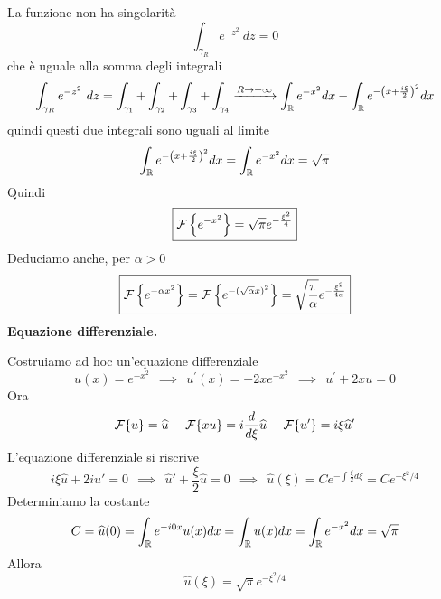 La funzione non ha singolarità
\begin{equation*}
\int _{\gamma _{R}} e^{ - z^{2}} \ dz = 0
\end{equation*}
che è uguale alla somma degli integrali
\begin{equation*}
\int _{\gamma _{R}} e^{ - z^{2}} \ dz = \int _{\gamma _{1}} + \int _{\gamma _{2}} + \int _{\gamma _{3}} + \int _{\gamma _{4}}\xrightarrow{R\rightarrow + \infty }\int _{\mathbb{R} } e^{ - x^{2}} dx - \int _{\mathbb{R} } e^{ - \left(x + \frac{i\xi }{2}\right)^{2}} dx
\end{equation*}
quindi questi due integrali sono uguali al limite
\begin{equation*}
\int _{\mathbb{R} } e^{ - \left(x + \frac{i\xi }{2}\right)^{2}} dx = \int _{\mathbb{R} } e^{ - x^{2}} dx = \sqrt{\pi }
\end{equation*}
Quindi
\begin{equation*}
\boxed{\mathcal{F} \left\{e^{ - x^{2}}\right\} = \sqrt{\pi } e^{ - \frac{\xi ^{2}}{4}}}
\end{equation*}
Deduciamo anche, per $\alpha  > 0$
\begin{equation*}
\boxed{\mathcal{F} \left\{e^{ - \alpha x^{2}}\right\} = \mathcal{F} \left\{e^{ - (\sqrt{\alpha } x)^{2}}\right\} = \sqrt{\frac{\pi }{\alpha }} e^{ - \frac{\xi ^{2}}{4\alpha }}}
\end{equation*}
\textbf{Equazione differenziale.}

Costruiamo ad hoc un'equazione differenziale
\begin{equation*}
u(x) = e^{ - x^{2}} \ \ \implies \ \ u^{'} (x) = -2xe^{ - x^{2}} \ \ \implies \ \ u^{'} + 2xu = 0
\end{equation*}
Ora
\begin{equation*}
\mathcal{F} \{u\} = \widehat{u} \ \ \ \ \mathcal{F} \{xu\} = i\frac{d}{d\xi }\widehat{u} \ \ \ \ \mathcal{F} \{u'\} = i\xi \widehat{u} '
\end{equation*}
L'equazione differenziale si riscrive
\begin{equation*}
i\xi \hat{u} + 2i\hat{u} ' = 0\ \ \implies \ \ \hat{u} ' + \frac{\xi }{2}\hat{u} = 0\ \ \implies \ \ \hat{u}(\xi) = Ce^{ - \int \frac{\xi }{2} d\xi } = Ce^{ - \xi ^{2} /4}
\end{equation*}
Determiniamo la costante
\begin{equation*}
C = \widehat{u}(0) = \int _{\mathbb{R} } e^{ - i0x} u(x) dx = \int _{\mathbb{R} } u(x) dx = \int _{\mathbb{R} } e^{ - x^{2}} dx = \sqrt{\pi }
\end{equation*}
Allora
\begin{equation*}
\boxed{\hat{u}(\xi) = \sqrt{\pi } e^{ - \xi ^{2} /4}}
\end{equation*}
\Soluzione

